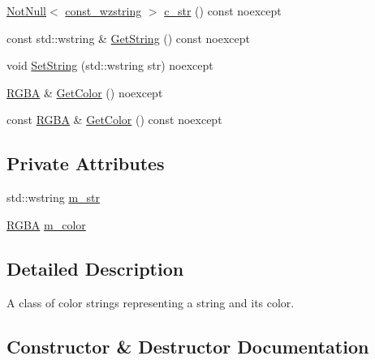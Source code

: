 \begin{DoxyCompactItemize}
\item 
\mbox{\hyperlink{namespacemage_a8769f9d670d6b585ea306cb1062af94b}{Not\+Null}}$<$ \mbox{\hyperlink{namespacemage_ac409e0f2a22292a3a4cd42742994fbf0}{const\+\_\+wzstring}} $>$ \mbox{\hyperlink{classmage_1_1rendering_1_1_color_string_a2706724097d2ad5c187d34db49d86bda}{c\+\_\+str}} () const noexcept
\item 
const std\+::wstring \& \mbox{\hyperlink{classmage_1_1rendering_1_1_color_string_a953db2aabafa120aab206e1295f92992}{Get\+String}} () const noexcept
\item 
void \mbox{\hyperlink{classmage_1_1rendering_1_1_color_string_a3f5139de7675dc21f4f444fae8a1983d}{Set\+String}} (std\+::wstring str) noexcept
\item 
\mbox{\hyperlink{structmage_1_1_r_g_b_a}{R\+G\+BA}} \& \mbox{\hyperlink{classmage_1_1rendering_1_1_color_string_a396ed7da3f3b27068b05c1ead9816046}{Get\+Color}} () noexcept
\item 
const \mbox{\hyperlink{structmage_1_1_r_g_b_a}{R\+G\+BA}} \& \mbox{\hyperlink{classmage_1_1rendering_1_1_color_string_a08bd67511180f15e902ce34dd402fe82}{Get\+Color}} () const noexcept
\end{DoxyCompactItemize}
\subsection*{Private Attributes}
\begin{DoxyCompactItemize}
\item 
std\+::wstring \mbox{\hyperlink{classmage_1_1rendering_1_1_color_string_af19cfa7bbdd66a1f83dd44dd9533f5ed}{m\+\_\+str}}
\item 
\mbox{\hyperlink{structmage_1_1_r_g_b_a}{R\+G\+BA}} \mbox{\hyperlink{classmage_1_1rendering_1_1_color_string_a6b062bfa44b3786c5e8f2e8d18a373ca}{m\+\_\+color}}
\end{DoxyCompactItemize}


\subsection{Detailed Description}
A class of color strings representing a string and its color. 

\subsection{Constructor \& Destructor Documentation}
\mbox{\label{classmage_1_1rendering_1_1_color_string_a17c74901fb2225c01f037caecc31f322}} 
